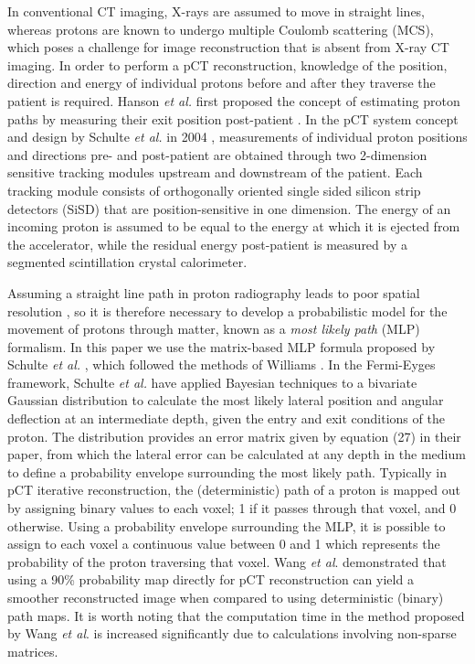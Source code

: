 \documentclass[preprint,times]{elsarticle}
\begin{document}
In conventional CT imaging, X-rays are assumed to move in straight lines, whereas protons are known to undergo multiple Coulomb scattering (MCS), which poses a challenge for image reconstruction that is absent from X-ray CT imaging. In order to perform a pCT reconstruction, knowledge of the position, direction and energy of individual protons before and after they traverse the patient is required. Hanson \emph{et al.} first proposed the concept of estimating proton paths by measuring their exit position post-patient \citep{Hanson78,Hanson79,Hanson81}. In the pCT system concept and design by Schulte \textit{et al.} in 2004 \citep{schulte}, measurements of individual proton positions and directions pre- and post-patient are obtained through two 2-dimension sensitive tracking modules upstream and downstream of the patient. Each tracking module consists of 
orthogonally oriented single sided silicon strip detectors (SiSD) that are position-sensitive in one dimension. The energy of an incoming proton is assumed to be equal to the energy at which it is ejected from the accelerator, while the residual energy post-patient is measured by a segmented scintillation crystal calorimeter.

Assuming a straight line path in proton radiography leads to poor spatial resolution \citep{schneiderpedroni}, so it is therefore necessary to develop a probabilistic model for the movement of protons through matter, known as a \emph{most likely path} (MLP) formalism. In this paper we use the matrix-based MLP formula proposed by Schulte \emph{et al.} \citep{penfoldMLP}, which followed the methods of Williams \citep{williams}. In the Fermi-Eyges framework, Schulte \emph{et al.} have applied Bayesian techniques to a bivariate Gaussian distribution to calculate the most likely lateral position and angular deflection at an intermediate depth, given the entry and exit conditions of the proton. The distribution provides an error matrix given by equation (27) in their paper, from which the lateral error can be calculated at any depth in the medium to define a probability envelope surrounding the most likely path. Typically in pCT iterative reconstruction, the (deterministic) path of a proton is mapped out by assigning binary values to each voxel; 1 if it passes through that voxel, and 0 otherwise. Using a probability envelope surrounding the MLP, it is possible to assign to each voxel a continuous value between 0 and 1 which represents the probability of the proton traversing that voxel. Wang \textit{et al}. \citep{wangmackietome} demonstrated that using a 90\% probability map directly for pCT reconstruction can yield a smoother reconstructed image when compared to using deterministic (binary) path maps. It is worth noting that the computation time in the method proposed by Wang \textit{et al}. \citep{wangmackietome} is increased significantly due to calculations involving non-sparse matrices. 
\end{document}
